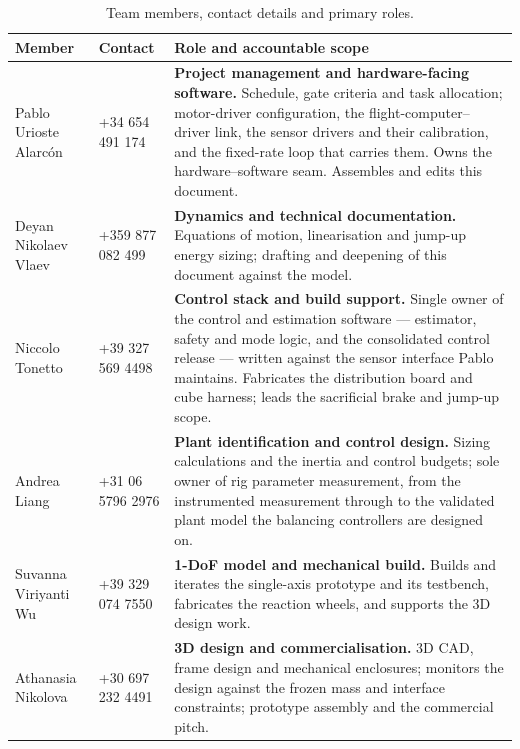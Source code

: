 \begin{table}[htbp]
\centering
\caption[Team members, contact details and primary roles]{Team members, contact details and primary roles.}
\label{tab:team_roles}
\footnotesize
\setlength{\tabcolsep}{4pt}
\begin{tabular}{@{}L{2.7cm}L{4.2cm}L{7.6cm}@{}}
\toprule
\textbf{Member} & \textbf{Contact} & \textbf{Role and accountable scope} \\
\midrule
Pablo Urioste Alarcón &
+34 654 491 174 &
\textbf{Project management and hardware-facing software.} Schedule, gate
criteria and task allocation; motor-driver configuration, the
flight-computer--driver link, the sensor drivers and their calibration, and the
fixed-rate loop that carries them. Owns the hardware--software seam. Assembles
and edits this document. \\
\addlinespace
Deyan Nikolaev Vlaev &
+359 877 082 499 &
\textbf{Dynamics and technical documentation.} Equations of motion,
linearisation and jump-up energy sizing; drafting and deepening of this document
against the model. \\
\addlinespace
Niccolo Tonetto&
+39 327 569 4498 &
\textbf{Control stack and build support.} Single owner of the control and
estimation software --- estimator, safety and mode logic, and the consolidated
control release --- written against the sensor interface Pablo maintains.
Fabricates the distribution board and cube harness; leads the sacrificial brake
and jump-up scope. \\
\addlinespace
Andrea Liang &
+31 06 5796 2976 &
\textbf{Plant identification and control design.} Sizing calculations and the
inertia and control budgets; sole owner of rig parameter measurement, from the
instrumented measurement through to the validated plant model the balancing
controllers are designed on. \\
\addlinespace
Suvanna Viriyanti Wu &
+39 329 074 7550 &
\textbf{1-DoF model and mechanical build.} Builds and iterates the single-axis
prototype and its testbench, fabricates the reaction wheels, and supports the 3D
design work. \\
\addlinespace
Athanasia Nikolova &
+30 697 232 4491 &
\textbf{3D design and commercialisation.} 3D CAD, frame design and mechanical
enclosures; monitors the design against the frozen mass and interface
constraints; prototype assembly and the commercial pitch. \\
\bottomrule
\end{tabular}
\end{table}

